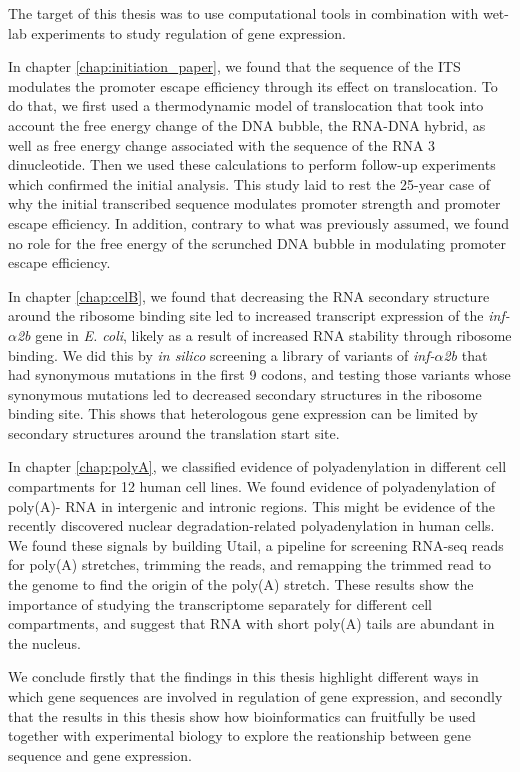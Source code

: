 %
The target of this thesis was to use computational tools in combination with
wet-lab experiments to study regulation of gene expression.

In chapter \ref{chap:initiation_paper}, we found that the sequence of the ITS
modulates the promoter escape efficiency through its effect on translocation.
To do that, we first used a thermodynamic model of translocation that took into
account the free energy change of the DNA bubble, the RNA-DNA hybrid, as well
as free energy change associated with the sequence of the RNA 3\ppp
dinucleotide. Then we used these calculations to perform follow-up experiments
which confirmed the initial analysis. This study laid to rest the 25-year case
of why the initial transcribed sequence modulates promoter strength and
promoter escape efficiency. In addition, contrary to what was previously
assumed, we found no role for the free energy of the scrunched DNA bubble in
modulating promoter escape efficiency.

In chapter \ref{chap:celB}, we found that decreasing the RNA secondary
structure around the ribosome binding site led to increased transcript
expression of the \textit{inf-$\alpha$2b} gene in \textit{E. coli}, likely as a
result of increased RNA stability through ribosome binding. We did this by
\textit{in silico} screening a library of variants of \textit{inf-$\alpha$2b}
that had synonymous mutations in the first 9 codons, and testing those variants
whose synonymous mutations led to decreased secondary structures in the
ribosome binding site. This shows that heterologous gene expression can be
limited by secondary structures around the translation start site.

In chapter \ref{chap:polyA}, we classified evidence of polyadenylation in
different cell compartments for 12 human cell lines. We found evidence of
polyadenylation of poly(A)- RNA in intergenic and intronic regions. This might
be evidence of the recently discovered nuclear degradation-related
polyadenylation in human cells. We found these signals by building Utail, a
pipeline for screening RNA-seq reads for poly(A) stretches, trimming the reads,
and remapping the trimmed read to the genome to find the origin of the poly(A)
stretch. These results show the importance of studying the transcriptome
separately for different cell compartments, and suggest that RNA with short
poly(A) tails are abundant in the nucleus.

We conclude firstly that the findings in this thesis highlight different ways
in which gene sequences are involved in regulation of gene expression, and
secondly that the results in this thesis show how bioinformatics can fruitfully
be used together with experimental biology to explore the reationship between
gene sequence and gene expression.
